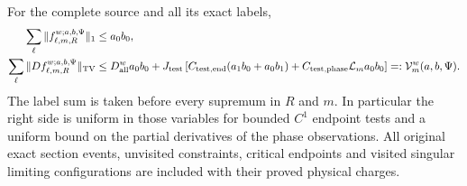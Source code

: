 \begin{theorem}
\label{thm:wo-bv}
For the complete source and all its exact labels,
\begin{align}
 \sum_\ell\|f^{w;a,b,\Psi}_{\ell,m,R}\|_1&\le a_0b_0,
                                                        \label{eq:wo-mass}\\
 \sum_\ell\|D f^{w;a,b,\Psi}_{\ell,m,R}\|_{\rm TV}
 &\le D_{\rm all}^w a_0b_0
 +J_{\rm test}\left[
 C_{\rm test,end}(a_1b_0+a_0b_1)
       +C_{\rm test,phase}\mathcal L_m a_0b_0\right]
 =:\mathcal V_m^w(a,b,\Psi).                         \label{eq:wo-variation}
\end{align}
The label sum is taken before every supremum in $R$ and $m$.
In particular the right side is uniform in those variables for
bounded $C^1$ endpoint tests and a uniform bound on the partial
derivatives of the phase observations.  All original exact section
events, unvisited constraints, critical endpoints and visited
singular limiting configurations are included with their proved
physical charges.
\end{theorem}
